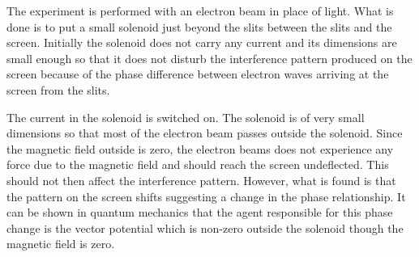 	The experiment is performed with an electron beam in place of light. What is done is to put a small solenoid just beyond the slits between the slits and the screen. Initially the solenoid does not carry any current and its dimensions are small enough so that it does not disturb the interference pattern produced on the screen because of the phase difference between electron waves arriving at the screen from the slits.
	
	The current in the solenoid is switched on. The solenoid is of very small dimensions so that most of the electron beam passes outside the solenoid. Since the magnetic field outside is zero, the electron beams does not experience any force due to the magnetic field and should reach the screen undeflected. This should not then affect the interference pattern. However, what is found is that the pattern on the screen shifts suggesting a change in the phase relationship. It can be shown in quantum mechanics that the agent responsible for this phase change is the vector potential which is non-zero outside the solenoid though the magnetic field is zero.
	
